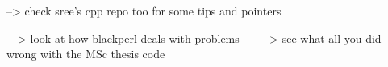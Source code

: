 \documentclass{article}
\begin{document}
--> check sree's cpp repo too for some tips and pointers 

---> look at how blackperl deals with problems
-------> see what all you did wrong with the MSc thesis code
\end{document}
